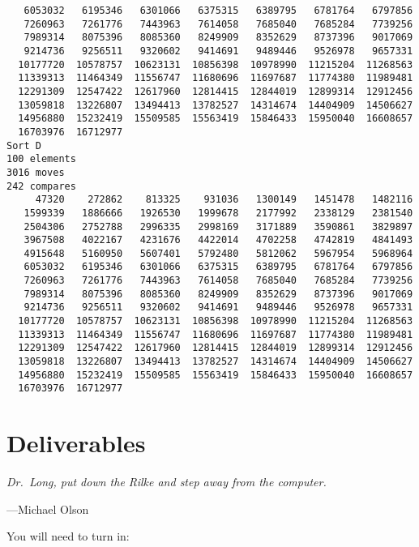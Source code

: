 \documentclass{article}
\begin{document}
\begin{lstlisting}
   6053032   6195346   6301066   6375315   6389795   6781764   6797856
   7260963   7261776   7443963   7614058   7685040   7685284   7739256
   7989314   8075396   8085360   8249909   8352629   8737396   9017069
   9214736   9256511   9320602   9414691   9489446   9526978   9657331
  10177720  10578757  10623131  10856398  10978990  11215204  11268563
  11339313  11464349  11556747  11680696  11697687  11774380  11989481
  12291309  12547422  12617960  12814415  12844019  12899314  12912456
  13059818  13226807  13494413  13782527  14314674  14404909  14506627
  14956880  15232419  15509585  15563419  15846433  15950040  16608657
  16703976  16712977
Sort D
100 elements
3016 moves
242 compares
     47320    272862    813325    931036   1300149   1451478   1482116
   1599339   1886666   1926530   1999678   2177992   2338129   2381540
   2504306   2752788   2996335   2998169   3171889   3590861   3829897
   3967508   4022167   4231676   4422014   4702258   4742819   4841493
   4915648   5160950   5607401   5792480   5812062   5967954   5968964
   6053032   6195346   6301066   6375315   6389795   6781764   6797856
   7260963   7261776   7443963   7614058   7685040   7685284   7739256
   7989314   8075396   8085360   8249909   8352629   8737396   9017069
   9214736   9256511   9320602   9414691   9489446   9526978   9657331
  10177720  10578757  10623131  10856398  10978990  11215204  11268563
  11339313  11464349  11556747  11680696  11697687  11774380  11989481
  12291309  12547422  12617960  12814415  12844019  12899314  12912456
  13059818  13226807  13494413  13782527  14314674  14404909  14506627
  14956880  15232419  15509585  15563419  15846433  15950040  16608657
  16703976  16712977
\end{lstlisting}


\section{Deliverables}
\epigraph{\emph{Dr.\ Long, put down the Rilke and step away from the
computer.}}{---Michael Olson}

You will need to turn in:
\end{document}
